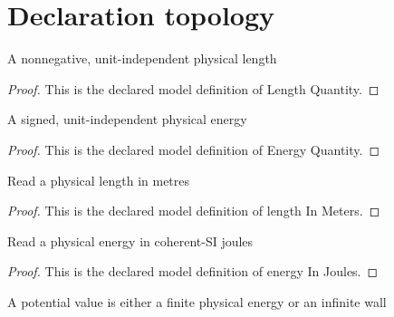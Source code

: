 \section{Declaration topology}
\begin{definition}
  \label{def:physics:phyx-mini-0546:phyxminiproblems-problemphyxmini0546-lengthquantity}
  A nonnegative, unit-independent physical length
\end{definition}
\begin{proof}
  This is the declared model definition of Length Quantity.
\end{proof}
\begin{definition}
  \label{def:physics:phyx-mini-0546:phyxminiproblems-problemphyxmini0546-energyquantity}
  A signed, unit-independent physical energy
\end{definition}
\begin{proof}
  This is the declared model definition of Energy Quantity.
\end{proof}
\begin{definition}
  \label{def:physics:phyx-mini-0546:phyxminiproblems-problemphyxmini0546-lengthinmeters}
  Read a physical length in metres
\end{definition}
\begin{proof}
  This is the declared model definition of length In Meters.
\end{proof}
\begin{definition}
  \label{def:physics:phyx-mini-0546:phyxminiproblems-problemphyxmini0546-energyinjoules}
  Read a physical energy in coherent-SI joules
\end{definition}
\begin{proof}
  This is the declared model definition of energy In Joules.
\end{proof}
\begin{definition}
  \label{def:physics:phyx-mini-0546:phyxminiproblems-problemphyxmini0546-potentialvalue}
  A potential value is either a finite physical energy or an infinite wall
\end{definition}
